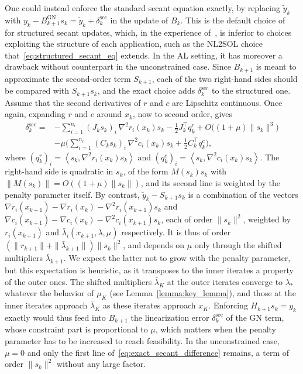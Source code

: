 \documentclass{article}
\numberwithin{equation}{section}
\newcommand{\inner}[2]{\left\langle {#1} , {#2} \right\rangle} %
\theoremstyle{plain}
\begin{document}
One could instead enforce the standard secant equation exactly, by replacing $\tilde{y}_k$ with $y_k - B^{\mathrm{GN}}_{k+1}s_k = \tilde{y}_k + \delta^{\mathrm{sec}}_k$ in the update of $B_k$. This is the default choice of~\cite{denniswalker:1981} for structured secant updates, which, in the experience of~\cite{dennis-etal:1989}, is inferior to choices exploiting the structure of each application, such as the NL2SOL choice that~\eqref{eq:structured_secant_eq} extends. In the AL setting, it has moreover a drawback without counterpart in the unconstrained case. Since $B_{k+1}$ is meant to approximate the second-order term $S_{k+1}$, each of the two right-hand sides should be compared with $S_{k+1}s_k$, and the exact choice adds $\delta^{\mathrm{sec}}_k$ to the structured one. Assume that the second derivatives of $r$ and $c$ are Lipschitz continuous. Once again, expanding $r$ and $c$ around $x_k$, now to second order, gives
\begin{equation}\label{eq:exact_secant_difference}
	\begin{aligned}
		\delta^{\mathrm{sec}}_k = {}& -\sum_{i=1}^{n_r}(J_ks_k)_i\,\nabla^2 r_i(x_k)s_k - \tfrac{1}{2}J_k^\top q^r_k + O\big((1+\mu)\|s_k\|^3\big)\\
		& -\mu\Big(\sum_{i=1}^{n_c}(C_ks_k)_i\,\nabla^2 c_i(x_k)s_k + \tfrac{1}{2}C_k^\top q^c_k\Big),
	\end{aligned}
\end{equation}
where $(q^r_k)_i = \inner{s_k}{\nabla^2 r_i(x_k)s_k}$ and $(q^c_k)_i = \inner{s_k}{\nabla^2 c_i(x_k)s_k}$. The right-hand side is quadratic in $s_k$, of the form $M(s_k)s_k$ with $\|M(s_k)\| = O((1+\mu)\|s_k\|)$, and its second line is weighted by the penalty parameter itself. By contrast, $\tilde{y}_k - S_{k+1}s_k$ is a combination of the vectors $\nabla r_i(x_{k+1}) - \nabla r_i(x_k) - \nabla^2 r_i(x_{k+1})s_k$ and $\nabla c_i(x_{k+1}) - \nabla c_i(x_k) - \nabla^2 c_i(x_{k+1})s_k$, each of order $\|s_k\|^2$, weighted by $r_i(x_{k+1})$ and $\bar{\lambda}_i(x_{k+1},\lambda,\mu)$ respectively. It is thus of order $(\|r_{k+1}\| + \|\bar{\lambda}_{k+1}\|)\|s_k\|^2$, and depends on $\mu$ only through the shifted multipliers $\bar{\lambda}_{k+1}$. We expect the latter not to grow with the penalty parameter, but this expectation is heuristic, as it transposes to the inner iterates a property of the outer ones. The shifted multipliers $\bar{\lambda}_K$ at the outer iterates converge to $\lambda_*$ whatever the behavior of $\mu_K$ (see Lemma~\ref{lemma:key_lemma}), and those at the inner iterates approach $\bar{\lambda}_K$ as these iterates approach $x_K$. Enforcing $H_{k+1}s_k = y_k$ exactly would thus feed into $B_{k+1}$ the linearization error $\delta^{\mathrm{sec}}_k$ of the GN term, whose constraint part is proportional to $\mu$, which matters when the penalty parameter has to be increased to reach feasibility. In the unconstrained case, $\mu = 0$ and only the first line of~\eqref{eq:exact_secant_difference} remains, a term of order $\|s_k\|^2$ without any large factor.
\end{document}
